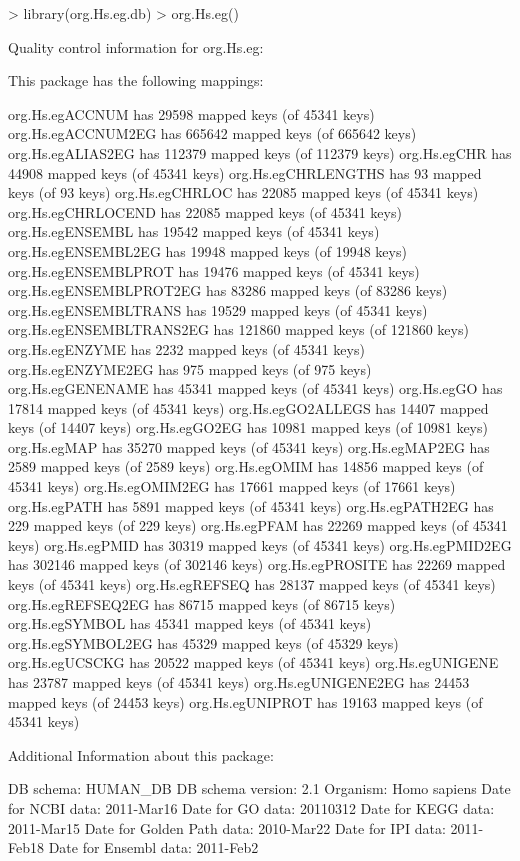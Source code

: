\documentclass[11pt]{article}
\begin{document}
\begin{Schunk}
\begin{Sinput}
> library(org.Hs.eg.db)
> org.Hs.eg()
\end{Sinput}
\begin{Soutput}
Quality control information for org.Hs.eg:


This package has the following mappings:

org.Hs.egACCNUM has 29598 mapped keys (of 45341 keys)
org.Hs.egACCNUM2EG has 665642 mapped keys (of 665642 keys)
org.Hs.egALIAS2EG has 112379 mapped keys (of 112379 keys)
org.Hs.egCHR has 44908 mapped keys (of 45341 keys)
org.Hs.egCHRLENGTHS has 93 mapped keys (of 93 keys)
org.Hs.egCHRLOC has 22085 mapped keys (of 45341 keys)
org.Hs.egCHRLOCEND has 22085 mapped keys (of 45341 keys)
org.Hs.egENSEMBL has 19542 mapped keys (of 45341 keys)
org.Hs.egENSEMBL2EG has 19948 mapped keys (of 19948 keys)
org.Hs.egENSEMBLPROT has 19476 mapped keys (of 45341 keys)
org.Hs.egENSEMBLPROT2EG has 83286 mapped keys (of 83286 keys)
org.Hs.egENSEMBLTRANS has 19529 mapped keys (of 45341 keys)
org.Hs.egENSEMBLTRANS2EG has 121860 mapped keys (of 121860 keys)
org.Hs.egENZYME has 2232 mapped keys (of 45341 keys)
org.Hs.egENZYME2EG has 975 mapped keys (of 975 keys)
org.Hs.egGENENAME has 45341 mapped keys (of 45341 keys)
org.Hs.egGO has 17814 mapped keys (of 45341 keys)
org.Hs.egGO2ALLEGS has 14407 mapped keys (of 14407 keys)
org.Hs.egGO2EG has 10981 mapped keys (of 10981 keys)
org.Hs.egMAP has 35270 mapped keys (of 45341 keys)
org.Hs.egMAP2EG has 2589 mapped keys (of 2589 keys)
org.Hs.egOMIM has 14856 mapped keys (of 45341 keys)
org.Hs.egOMIM2EG has 17661 mapped keys (of 17661 keys)
org.Hs.egPATH has 5891 mapped keys (of 45341 keys)
org.Hs.egPATH2EG has 229 mapped keys (of 229 keys)
org.Hs.egPFAM has 22269 mapped keys (of 45341 keys)
org.Hs.egPMID has 30319 mapped keys (of 45341 keys)
org.Hs.egPMID2EG has 302146 mapped keys (of 302146 keys)
org.Hs.egPROSITE has 22269 mapped keys (of 45341 keys)
org.Hs.egREFSEQ has 28137 mapped keys (of 45341 keys)
org.Hs.egREFSEQ2EG has 86715 mapped keys (of 86715 keys)
org.Hs.egSYMBOL has 45341 mapped keys (of 45341 keys)
org.Hs.egSYMBOL2EG has 45329 mapped keys (of 45329 keys)
org.Hs.egUCSCKG has 20522 mapped keys (of 45341 keys)
org.Hs.egUNIGENE has 23787 mapped keys (of 45341 keys)
org.Hs.egUNIGENE2EG has 24453 mapped keys (of 24453 keys)
org.Hs.egUNIPROT has 19163 mapped keys (of 45341 keys)


Additional Information about this package:

DB schema: HUMAN_DB
DB schema version: 2.1
Organism: Homo sapiens
Date for NCBI data: 2011-Mar16
Date for GO data: 20110312
Date for KEGG data: 2011-Mar15
Date for Golden Path data: 2010-Mar22
Date for IPI data: 2011-Feb18
Date for Ensembl data: 2011-Feb2
\end{Soutput}
\end{Schunk}
\end{document}
